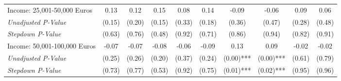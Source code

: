 \begin{tabular}{l c c c c c c c c c}
Income: 25,001-50,000 Euros & 0.13 & 0.12 & 0.15 & 0.08 & 0.14 & -0.09 & -0.06 & 0.09 & 0.06 \\
\quad \textit{Unadjusted P-Value} & (0.15) & (0.20) & (0.15) & (0.33) & (0.18) & (0.36) & (0.47) & (0.28) & (0.48) \\
\quad \textit{Stepdown P-Value} & (0.63) & (0.76) & (0.48) & (0.92) & (0.71) & (0.86) & (0.94) & (0.82) & (0.91) \\
Income: 50,001-100,000 Euros & -0.07 & -0.07 & -0.08 & -0.06 & -0.09 & 0.13 & 0.09 & -0.02 & -0.02 \\
\quad \textit{Unadjusted P-Value} & (0.25) & (0.26) & (0.20) & (0.37) & (0.24) & (0.00)*** & (0.00)*** & (0.61) & (0.79) \\
\quad \textit{Stepdown P-Value} & (0.73) & (0.77) & (0.53) & (0.92) & (0.75) & (0.01)*** & (0.02)*** & (0.95) & (0.96) \\
\bottomrule
\end{tabular}
